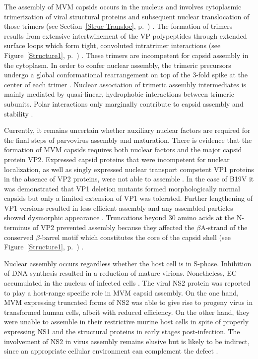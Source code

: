 The assembly of MVM capsids occurs in the nucleus and involves cytoplasmic trimerization of viral structural proteins and subsequent nuclear translocation of those trimers (see Section~\ref{Struc Transloc}, p.~\pageref{Struc Transloc}) \cite{pmid16469332}. The formation of trimers results from extensive intertwinement of the VP polypeptides through extended surface loops which form tight, convoluted intratrimer interactions (see Figure~\ref{Structure1}, p.~\pageref{Structure1}) \cite{pmid15299974, pmid21867712}. These trimers are incompetent for capsid assembly in the cytoplasm. In order to confer nuclear assembly, the trimeric precursors undergo a global conformational rearrangement on top of the 3-fold spike at the center of each trimer \cite{pmid16469332, pmid12552010, pmid17626084}. Nuclear association of trimeric assembly intermediates is mainly mediated by quasi-linear, hydrophobic interactions between trimeric subunits. Polar interactions only marginally contribute to capsid assembly and stability \cite{pmid14981262}.     

Currently, it remains uncertain whether auxiliary nuclear factors are required for the final steps of parvovirus assembly and maturation. There is evidence that the formation of MVM capsids requires both nuclear factors and the major capsid protein VP2. Expressed capsid proteins that were incompetent for nuclear localization, as well as singly expressed nuclear transport competent VP1 proteins in the absence of VP2 proteins, were not able to assemble \cite{pmid12072505, pmid10438891, pmid10729155}. In the case of B19V it was demonstrated that VP1 deletion mutants formed morphologically normal capsids but only a limited extension of VP1 was tolerated. Further lengthening of VP1 versions resulted in less efficient assembly and any assembled particles showed dysmorphic appearance \cite{pmid8207846}. Truncations beyond 30 amino acids at the N-terminus of VP2 prevented assembly because they affected the $\beta$A-strand of the conserved $\beta$-barrel motif which constitutes the core of the capsid shell (see Figure~\ref{Structure1}, p.~\pageref{Structure1}) \cite{pmid7666560}.     


Nuclear assembly occurs regardless whether the host cell is in S-phase. Inhibition of DNA synthesis resulted in a reduction of mature virions. Nonetheless, EC accumulated in the nucleus of infected cells \cite{pmid559779, assembly}. The viral NS2 protein was reported to play a host-range specific role in MVM capsid assembly. On the one hand, MVM expressing truncated forms of NS2 was able to give rise to progeny virus in transformed human cells, albeit with reduced efficiency. On the other hand, they were unable to assemble in their restrictive murine host cells in spite of properly expressing NS1 and the structural proteins in early stages post-infection. The involvement of NS2 in virus assembly remains elusive but is likely to be indirect, since an appropriate cellular environment can complement the defect \cite{pmid9168889}.        


